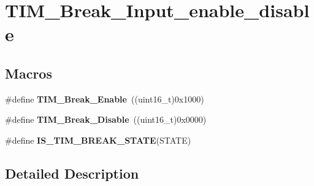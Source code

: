 \hypertarget{group___t_i_m___break___input__enable__disable}{\section{T\-I\-M\-\_\-\-Break\-\_\-\-Input\-\_\-enable\-\_\-disable}
\label{group___t_i_m___break___input__enable__disable}
}
\subsection*{Macros}
\begin{DoxyCompactItemize}
\item 
\hypertarget{group___t_i_m___break___input__enable__disable_gae7fbc11ac043454b2a880bffe98fdb8c}{\#define {\bfseries T\-I\-M\-\_\-\-Break\-\_\-\-Enable}~((uint16\-\_\-t)0x1000)}\label{group___t_i_m___break___input__enable__disable_gae7fbc11ac043454b2a880bffe98fdb8c}

\item 
\hypertarget{group___t_i_m___break___input__enable__disable_ga31ba16dd70ad4d99adc911f7bf6662e5}{\#define {\bfseries T\-I\-M\-\_\-\-Break\-\_\-\-Disable}~((uint16\-\_\-t)0x0000)}\label{group___t_i_m___break___input__enable__disable_ga31ba16dd70ad4d99adc911f7bf6662e5}

\item 
\#define {\bfseries I\-S\-\_\-\-T\-I\-M\-\_\-\-B\-R\-E\-A\-K\-\_\-\-S\-T\-A\-T\-E}(S\-T\-A\-T\-E)
\end{DoxyCompactItemize}


\subsection{Detailed Description}


